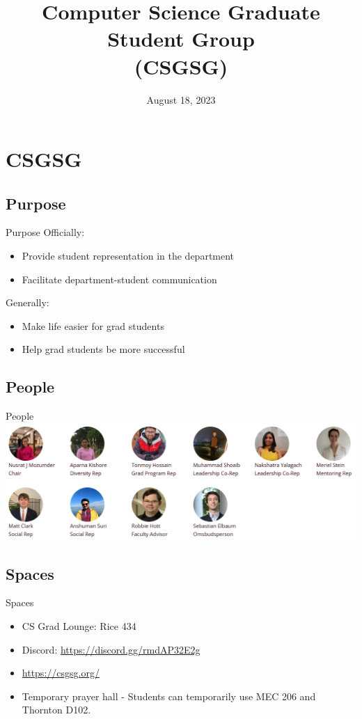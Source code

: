 \documentclass[aspectratio=169]{beamer}
\title{Computer Science Graduate Student Group \\ (CSGSG)}
\date{August 18, 2023}
\begin{document}
\begin{frame}[plain]
	\maketitle
\end{frame}

\section{CSGSG}

\subsection{Purpose}
\begin{frame}{Purpose}
Officially: 
\begin{itemize}
    \item Provide student representation in the department
    \item Facilitate department-student communication 
\end{itemize}
Generally:
\begin{itemize}
    \item Make life easier for grad students
    \item Help grad students be more successful 
\end{itemize}
\end{frame}

\subsection{People}
\begin{frame}{People}
    \centering\includegraphics[width=\textwidth]{people.PNG}
\end{frame}



\subsection{Spaces}
\begin{frame}{Spaces}
\begin{itemize}
    \item CS Grad Lounge: Rice 434
    \item Discord: \url{https://discord.gg/rmdAP32E2g}
    \item \url{https://csgsg.org/}
    \item Temporary prayer hall - Students can temporarily use MEC 206 and Thornton D102.
\end{itemize}
\end{frame}
\end{document}
